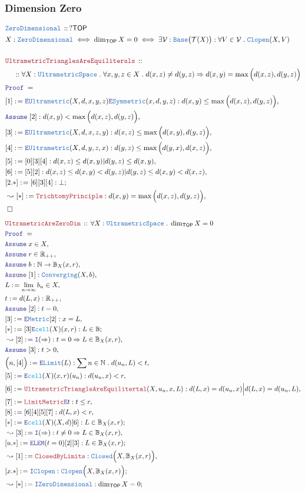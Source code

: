\documentclass[12pt]{scrartcl}
\newcommand{\TYPE}[1]{\textcolor{NavyBlue}{\mathtt{#1}}}
\newcommand{\FUNC}[1]{\textcolor{Cerulean}{\mathtt{#1}}}
\newcommand{\LOGIC}[1]{\textcolor{Blue}{\mathtt{#1}}}
\newcommand{\THM}[1]{\textcolor{Maroon}{\mathtt{#1}}}
\renewcommand{\.}{\; . \;}
\newcommand{\de}{: \kern 0.1pc =}
\newcommand{\Theorem}[2]{& \THM{#1} \, :: \, #2 \\ & \Proof = \\ }
\newcommand{\DeclareType}[2]{& \TYPE{#1} \, :: \, #2 \\}
\newcommand{\DefineNamedType}[4]{& #1 : \TYPE{#2} \iff #3 \iff #4 \\}
\newcommand{\NewLine}{\\ & \kern 1pc}
\newcommand{\Page}[1]{ \begin{align*} #1 \end{align*}   }
\newcommand{\Imply}{\Rightarrow}
\newcommand{\Intro}{\LOGIC{I}}
\newcommand{\Elim}{\LOGIC{E}}
\newcommand{\Reals}{\mathbb{R} }
\newcommand{\Nat}{\mathbb{N} }
\newcommand{\Say}[3]{& #1 \de #2 : #3, \\}
\newcommand{\SayIn}[3]{& #1 \de #2 \in #3, \\}
\newcommand{\Conclude}[3]{& #1 \de #2 : #3; \\}
\newcommand{\Derive}[3]{& \leadsto #1 \de #2 : #3, \\}
\newcommand{\DeriveConclude}[3]{& \leadsto #1 \de #2 : #3 ; \\}
\newcommand{\Assume}[2]{& \LOGIC{Assume} \; #1 : #2, \\}
\newcommand{\AssumeIn}[2]{& \LOGIC{Assume} \; #1 \in #2, \\}
\newcommand{\QED}{\; \square}
\newcommand{\EndProof}{& \QED \\}
\newcommand{\Proof}{\LOGIC{Proof} \; }
\newcommand{\Clopen}{\TYPE{Clopen}}
\newcommand{\TOP}{\mathsf{TOP}}
\newcommand{\T}{\mathcal{T}}
\newcommand{\V}{\mathcal{V}}
\begin{document}
\subsubsection{Dimension Zero}
\Page{
	\DeclareType{ZeroDimensional}{?\TOP}
	\DefineNamedType{X}{ZeroDimensional}{\dim_\TOP X = 0}
	{
		\exists \V : \TYPE{Base}\big(\T(X)\big) : \forall V \in \V \.
		\TYPE{Clopen}(X,V)
	}
	\\
	\Theorem{UltrametricTrianglesAreEquiliterals}
	{
		\NewLine
		:: 
		\forall X : \TYPE{UltrametricSpace} \.
		\forall x,y,z \in X \. 
		d(x,z) \neq d(y,z) 
		\Imply
		d(x,y) = \max\Big( d(x,z),d(y,z)\Big)
	}
	\Say{[1]}{\Elim \TYPE{Ultrametric}(X,d,x,y,z)\Elim \TYPE{Symmetric}(x,d,y,z)}
	{
		d(x,y) \le \max\Big( d(x,z), d(y,z) \Big)
	}
	\Assume{[2]}{d(x,y) < \max\Big( d(x,z),d(y,z) \Big)}
	\Say{[3]}{\Elim \TYPE{Ultrametric}(X,d,x,z,y)}{ d(x,z) \le \max\Big( d(x,y),d(y,z) \Big)  }
	\Say{[4]}{\Elim \TYPE{Ultrametric}(X,d,y,z,x)}{ d(y,z) \le \max\Big( d(y,x),d(x,z) \Big)  }
	\Say{[5]}{[0][3][4]}{d(x,z) \le d(x,y) | d(y,z) \le d(x,y) }
	\Say{[6]}{[5][2]}{d(x,z) \le d(x,y) < d(y,z) | d(y,z) \le d(x,y) < d(x,z) }
	\Conclude{[2.*]}{[6][3][4]}{ \bot }
	\Derive{[*]}{\THM{TrichtomyPrinciple}}{d(x,y) = \max\Big(d(x,z), d(y,z) \Big)}
	\EndProof
}\Page{
	\Theorem{UltrametricAreZeroDim}
	{
		\forall X : \TYPE{UltrametricSpace} \. 
		\dim_\TOP X = 0
	}
	\AssumeIn{x}{X}
	\AssumeIn{r}{\Reals_{++}}
	\Assume{b}{\Nat \to \mathbb{B}_X(x,r)}
	\Assume{[1]}{\TYPE{Converging}(X,b)}
	\SayIn{L}{\lim_{n \to \infty} b_n}{X}
	\Say{t}{d(L,x)}{\Reals_{++}}
	\Assume{[2]}{t = 0}
	\Say{[3]}{\Elim \TYPE{Metric}[2]}{x = L}
	\Conclude{[*]}{[3]\Elim  \FUNC{cell}(X)(x,r)}{ L \in \mathbb{B} }
	\Derive{[2]}{\Intro(\Imply) }
	{
		t = 0 \Imply L \in \mathbb{B}_X(x,r)
	}
	\Assume{[3]}{t > 0}
	\Say{\Big(n,[4]\Big)}{\Elim \TYPE{Limit}(L)}
	{
		\sum n \in \Nat \. d(u_n, L) < t
	}
	\Say{[5]}{\Elim \FUNC{cell}(X)(x,r)(u_n)}
	{
		d(u_n,x) < r
	}
	\Say{[6]}{\THM{UltrametricTriangleAreEquilitertal}(X,u_n,x,L)}
	{
		d(L,x) = d(u_n,x) \Big| d(L,x) = d(u_n,L)
	}
	\Say{[7]}{\THM{LimitMetric}\Elim t}{t \le r}
	\Say{[8]}{[6][4][5][7]}{d(L,x) < r}
	\Conclude{[*]}{\Elim \FUNC{cell}(X)(X,d)[6]}
	{
		L \in \mathbb{B}_X(x,r)
	}
	\Derive{[3]}{\Intro(\Imply) }
	{
		t \neq 0 \Imply L \in \mathbb{B}_X(x,r) 
	}
	\Conclude{[u.*]}{\Elim \LOGIC{LEM}(t=0)[2][3]}
	{
		L \in \mathbb{B}_X(x,r)
	}
	\Derive{[1]}{\THM{ClosedByLimits}}{\TYPE{Closed}\Big( X,\mathbb{B}_X(x,r) \Big)}
	\Conclude{[x.*]}{\Intro \Clopen}{\Clopen\Big(X,\mathbb{B}_X(x,r)\Big)}
	\DeriveConclude{[*]}{\Intro \TYPE{ZeroDimensional}}{\dim_\TOP X = 0}
}
\end{document}
